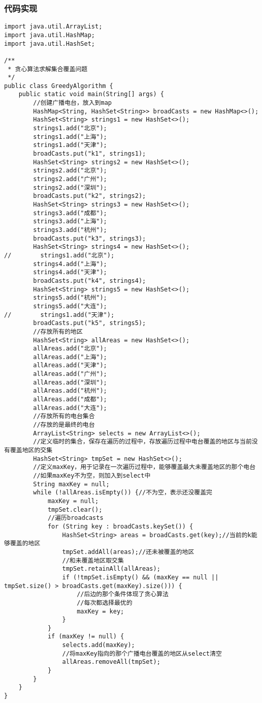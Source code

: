 \documentclass[a4paper]{report}
\begin{document}
\subsubsection{代码实现}
\begin{lstlisting}
import java.util.ArrayList;
import java.util.HashMap;
import java.util.HashSet;

/**
 * 贪心算法求解集合覆盖问题
 */
public class GreedyAlgorithm {
    public static void main(String[] args) {
        //创建广播电台，放入到map
        HashMap<String, HashSet<String>> broadCasts = new HashMap<>();
        HashSet<String> strings1 = new HashSet<>();
        strings1.add("北京");
        strings1.add("上海");
        strings1.add("天津");
        broadCasts.put("k1", strings1);
        HashSet<String> strings2 = new HashSet<>();
        strings2.add("北京");
        strings2.add("广州");
        strings2.add("深圳");
        broadCasts.put("k2", strings2);
        HashSet<String> strings3 = new HashSet<>();
        strings3.add("成都");
        strings3.add("上海");
        strings3.add("杭州");
        broadCasts.put("k3", strings3);
        HashSet<String> strings4 = new HashSet<>();
//        strings1.add("北京");
        strings4.add("上海");
        strings4.add("天津");
        broadCasts.put("k4", strings4);
        HashSet<String> strings5 = new HashSet<>();
        strings5.add("杭州");
        strings5.add("大连");
//        strings1.add("天津");
        broadCasts.put("k5", strings5);
        //存放所有的地区
        HashSet<String> allAreas = new HashSet<>();
        allAreas.add("北京");
        allAreas.add("上海");
        allAreas.add("天津");
        allAreas.add("广州");
        allAreas.add("深圳");
        allAreas.add("杭州");
        allAreas.add("成都");
        allAreas.add("大连");
        //存放所有的电台集合
        //存放的是最终的电台
        ArrayList<String> selects = new ArrayList<>();
        //定义临时的集合，保存在遍历的过程中，存放遍历过程中电台覆盖的地区与当前没有覆盖地区的交集
        HashSet<String> tmpSet = new HashSet<>();
        //定义maxKey，用于记录在一次遍历过程中，能够覆盖最大未覆盖地区的那个电台
        //如果maxKey不为空，则加入到select中
        String maxKey = null;
        while (!allAreas.isEmpty()) {//不为空，表示还没覆盖完
            maxKey = null;
            tmpSet.clear();
            //遍历broadcasts
            for (String key : broadCasts.keySet()) {
                HashSet<String> areas = broadCasts.get(key);//当前的k能够覆盖的地区
                tmpSet.addAll(areas);//还未被覆盖的地区
                //和未覆盖地区取交集
                tmpSet.retainAll(allAreas);
                if (!tmpSet.isEmpty() && (maxKey == null || tmpSet.size() > broadCasts.get(maxKey).size())) {
                    //后边的那个条件体现了贪心算法
                    //每次都选择最优的
                    maxKey = key;
                }
            }
            if (maxKey != null) {
                selects.add(maxKey);
                //将maxKey指向的那个广播电台覆盖的地区从select清空
                allAreas.removeAll(tmpSet);
            }
        }
    }
}
\end{lstlisting}
\end{document}
